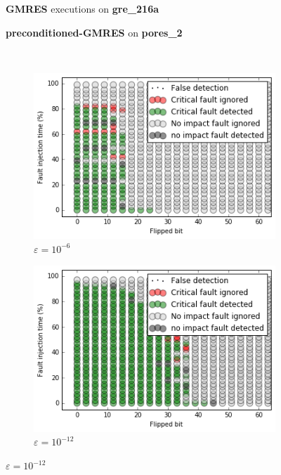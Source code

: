\begin{figure}[h]
	\centering
    
\begin{minipage}[b]{0.45\linewidth}
\centering
\textbf{GMRES} executions on \textbf{gre_216a} 
\end{minipage}
\quad
\begin{minipage}{0.45\linewidth}
\centering
\textbf{preconditioned-GMRES} on \textbf{pores_2}
\end{minipage}\\


    \begin{minipage}[b]{0.48\linewidth}
	
	\begin{subfigure}[t]{\linewidth}
		\centering
		\includegraphics[width=1.1\linewidth]{figures/gre_216a/test_result_c05_0.png}
		\caption{$\varepsilon = 10^{-6}$}\label{fig:gre_216a_test_result_c05_0}	
	\end{subfigure}
    \quad
    \begin{subfigure}[t]{\linewidth}
		\centering
		\includegraphics[width=1.1\linewidth]{figures/gre_216a/test_result_c05_1.png}
		\caption{$\varepsilon = 10^{-12}$}\label{fig:gre_216a_test_result_c05_1}	
	\end{subfigure}
    \end{minipage}
    \quad
    \begin{minipage}[b]{0.48\linewidth}
    	

\end{minipage}
\end{figure}
